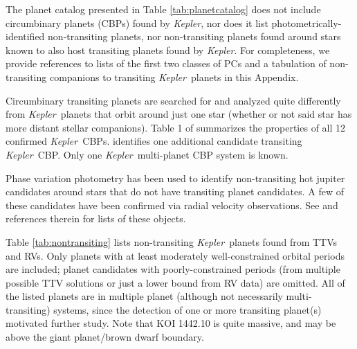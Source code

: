 \documentclass{aastex62}
\newcommand{\ikt}{{\it Kepler}}
\newcommand{\ik}{{\it Kepler~}}
\begin{document}
The planet catalog presented in Table \ref{tab:planetcatalog} does not include circumbinary planets (CBPs) found by \ikt, nor does it list photometrically-identified non-transiting planets, nor non-transiting planets found around stars known to also host transiting planets found by \ikt.  For completeness, we provide references to lists of the first two classes of PCs and a tabulation of non-transiting companions to transiting \ik planets in this Appendix.  

Circumbinary transiting planets are searched for and analyzed quite differently from \ik planets that orbit around just one star (whether or not said star has more distant stellar companions).  Table 1 of \cite{Martin:2022} summarizes the properties of all 12 confirmed \ik CBPs. \cite{Welsh:2019}  identifies one additional candidate transiting \ik CBP.  Only one \ik multi-planet CBP system is known.

Phase variation photometry has been used to identify non-transiting hot jupiter candidates around stars that do not have transiting planet candidates.  A few of these candidates have been confirmed via radial velocity observations. See \cite{Lillo-Box:2021} and references therein for lists of these objects. 

Table \ref{tab:nontransiting} lists non-transiting \ik planets found from TTVs and RVs. Only planets with at least moderately well-constrained orbital periods are included;  planet candidates with poorly-constrained periods (from multiple possible TTV solutions or just a lower bound from RV data) are omitted.  All of the listed planets are in multiple planet (although not necessarily multi-transiting) systems, since the detection of one or more transiting planet(s) motivated further study.
Note that KOI 1442.10 is quite massive, and may be above the giant planet/brown dwarf boundary.
\end{document}
